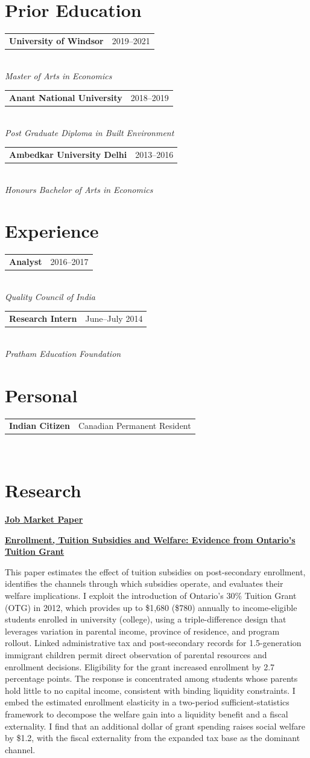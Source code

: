 \documentclass[11pt]{article}
\makeatletter
\newcommand{\cventry}[3]{%
  \noindent\begin{tabularx}{\linewidth}{@{}X r@{}}
    \textbf{#1} & #2 \\
  \end{tabularx}%
  \vspace{-2pt}\\
  \noindent\textit{#3}\par\vspace{6pt}%
}
\newcommand{\jmp}[3]{%
  \noindent\textbf{\underline{Job Market Paper}}\par
  \vspace{4pt}%
  \noindent\href{#1}{\textbf{#2}}\par
  \vspace{2pt}%
  \noindent #3\par
  \vspace{8pt}%
}
\makeatother
\begin{document}
\section{Prior Education}
\cventry{University of Windsor}{2019--2021}{Master of Arts in Economics}
\cventry{Anant National University}{2018--2019}{Post Graduate Diploma in Built Environment}
\cventry{Ambedkar University Delhi}{2013--2016}{Honours Bachelor of Arts in Economics}
\vspace{-0.3cm}
\section{Experience}
\cventry{Analyst}{2016--2017}{Quality Council of India}

\cventry{Research Intern}{June--July 2014}{Pratham Education Foundation}

\section{Personal}
\cventry{Indian Citizen}{Canadian Permanent Resident}
{}
\vspace{-0.4cm}
\section{Research}

\jmp{https://kritagyadhanda.site/files/JMP_DDD.pdf}{Enrollment, Tuition Subsidies and Welfare: Evidence from Ontario's Tuition Grant}{This paper estimates the effect of tuition subsidies on post-secondary enrollment, identifies the channels through which subsidies operate, and evaluates their welfare implications. I exploit the introduction of Ontario's 30\% Tuition Grant (OTG) in 2012, which provides up to \$1,680  (\$780) annually to income-eligible students enrolled in university (college), using a triple-difference design that leverages variation in parental income, province of residence, and program rollout. Linked administrative tax and post-secondary records for 1.5-generation immigrant children permit direct observation of parental resources and enrollment decisions. Eligibility for the grant increased enrollment by 2.7 percentage points. The response is concentrated among students whose parents hold little to no capital income, consistent with binding liquidity constraints. I embed the estimated enrollment elasticity in a two-period sufficient-statistics framework to decompose the welfare gain into a liquidity benefit and a fiscal externality. I find that an additional dollar of grant spending raises social welfare by \$1.2, with the fiscal externality from the expanded tax base as the dominant channel.}
\end{document}
